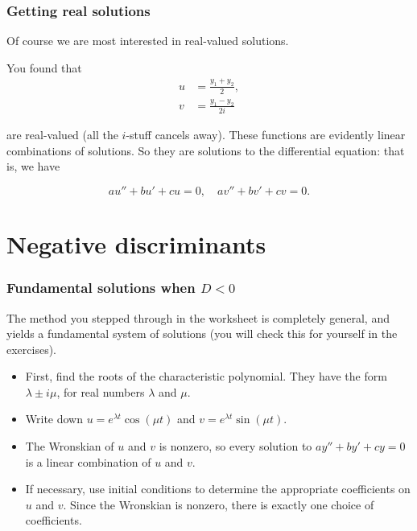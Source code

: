 \documentclass{beamer}
\begin{document}
\begin{frame}[t]\frametitle{Getting real solutions}
    Of course we are most interested in real-valued solutions.

    You found that
    \begin{align*}
        u &= \frac{y_1 + y_2}{2}, \\
        v &= \frac{y_1 - y_2}{2i}
    \end{align*}

    are real-valued (all the $i$-stuff cancels away). These functions are evidently linear combinations of solutions. So they are solutions to the differential equation: that is, we have

    \[
        au'' + bu' + cu = 0, \quad av'' + bv' + cv = 0.
    \]

\end{frame}
\section{Negative discriminants}

\begin{frame}[t]\frametitle{Fundamental solutions when $D < 0$}
    
    The method you stepped through in the worksheet is completely general, and yields a fundamental system of solutions (you will check this for yourself in the exercises).

    \begin{itemize}
        \item First, find the roots of the characteristic polynomial. They have the form $\lambda \pm i \mu$, for real numbers $\lambda$ and $\mu$.
        \item Write down $u = e^{\lambda t} \cos{(\mu t)}$ and $v = e^{\lambda t} \sin{(\mu t)}$. 
        \item The Wronskian of $u$ and $v$ is nonzero, so every solution to $ay'' + by' + cy = 0$ is a linear combination of $u$ and $v$.
        \item If necessary, use initial conditions to determine the appropriate coefficients on $u$ and $v$. Since the Wronskian is nonzero, there is exactly one choice of coefficients.
    \end{itemize}

\end{frame}
\end{document}
